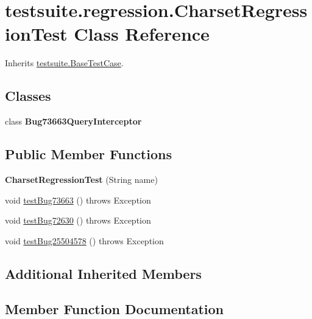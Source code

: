 \hypertarget{classtestsuite_1_1regression_1_1_charset_regression_test}{}\section{testsuite.\+regression.\+Charset\+Regression\+Test Class Reference}
\label{classtestsuite_1_1regression_1_1_charset_regression_test}


Inherits \mbox{\hyperlink{classtestsuite_1_1_base_test_case}{testsuite.\+Base\+Test\+Case}}.

\subsection*{Classes}
\begin{DoxyCompactItemize}
\item 
class {\bfseries Bug73663\+Query\+Interceptor}
\end{DoxyCompactItemize}
\subsection*{Public Member Functions}
\begin{DoxyCompactItemize}
\item 
\mbox{\label{classtestsuite_1_1regression_1_1_charset_regression_test_ad8877969c709ae03cc43ffd7a0db64fd}} 
{\bfseries Charset\+Regression\+Test} (String name)
\item 
void \mbox{\hyperlink{classtestsuite_1_1regression_1_1_charset_regression_test_a46c2702ffcbb3408a1b7fe21ba7b02d5}{test\+Bug73663}} ()  throws Exception 
\item 
void \mbox{\hyperlink{classtestsuite_1_1regression_1_1_charset_regression_test_aea47a9d0535dd2e8b09f2be63c4c5100}{test\+Bug72630}} ()  throws Exception 
\item 
void \mbox{\hyperlink{classtestsuite_1_1regression_1_1_charset_regression_test_a576343bc13a21ec028c8341e914f7e84}{test\+Bug25504578}} ()  throws Exception 
\end{DoxyCompactItemize}
\subsection*{Additional Inherited Members}


\subsection{Member Function Documentation}
\mbox{\label{classtestsuite_1_1regression_1_1_charset_regression_test_a576343bc13a21ec028c8341e914f7e84}} 
